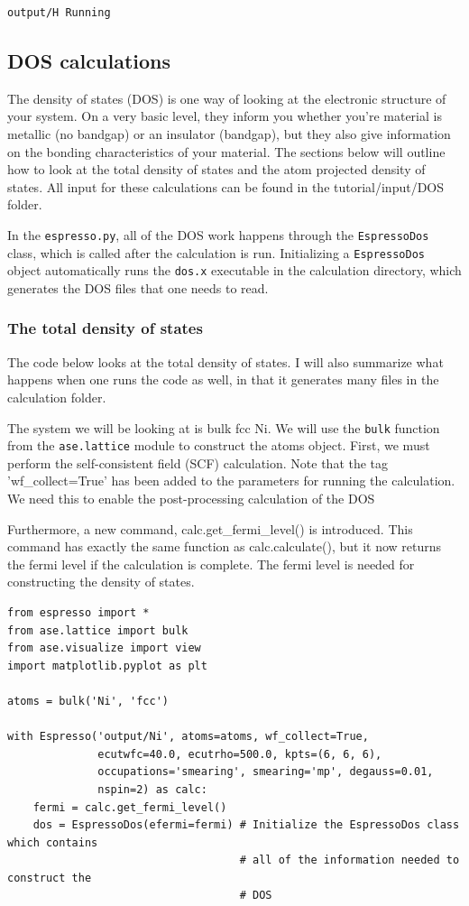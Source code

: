 \documentclass[colorlinks=true,urlcolor=blue,linkcolor=blue,citecolor=red]{article}
\begin{document}
\begin{verbatim}
output/H Running
\end{verbatim}

\subsection{DOS calculations}
\label{sec-3-2}
The density of states (DOS) is one way of looking at the electronic structure of your system. On a very basic level, they inform you whether you're material is metallic (no bandgap) or an insulator (bandgap), but they also give information on the bonding characteristics of your material. The sections below will outline how to look at the total density of states and the atom projected density of states. All input for these calculations can be found in the tutorial/input/DOS folder.

In the \texttt{espresso.py}, all of the DOS work happens through the \texttt{EspressoDos} class, which is called after the calculation is run. Initializing a \texttt{EspressoDos} object automatically runs the \texttt{dos.x} executable in the calculation directory, which generates the DOS files that one needs to read.

\subsubsection{The total density of states}
\label{sec-3-2-1}
The code below looks at the total density of states. I will also summarize what happens when one runs the code as well, in that it generates many files in the calculation folder.

The system we will be looking at is bulk fcc Ni. We will use the \texttt{bulk} function from the \texttt{ase.lattice} module to construct the atoms object. First, we must perform the self-consistent field (SCF) calculation. Note that the tag 'wf\_collect=True' has been added to the parameters for running the calculation. We need this to enable the post-processing calculation of the DOS

Furthermore, a new command, calc.get\_fermi\_level() is introduced. This command has exactly the same function as calc.calculate(), but it now returns the fermi level if the calculation is complete. The fermi level is needed for constructing the density of states.

\begin{verbatim}
from espresso import *
from ase.lattice import bulk
from ase.visualize import view
import matplotlib.pyplot as plt

atoms = bulk('Ni', 'fcc')

with Espresso('output/Ni', atoms=atoms, wf_collect=True,
              ecutwfc=40.0, ecutrho=500.0, kpts=(6, 6, 6),
              occupations='smearing', smearing='mp', degauss=0.01,
              nspin=2) as calc:
    fermi = calc.get_fermi_level()
    dos = EspressoDos(efermi=fermi) # Initialize the EspressoDos class which contains
                                    # all of the information needed to construct the
                                    # DOS
\end{verbatim}
\end{document}

